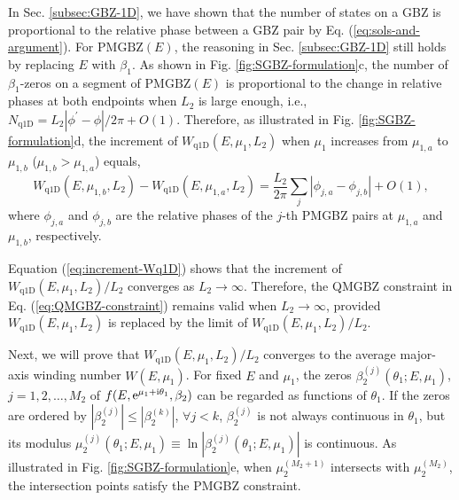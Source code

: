 In Sec. \ref{subsec:GBZ-1D}, we have shown that the number of states
on a GBZ is proportional to the relative phase between a GBZ pair
by Eq. (\ref{eq:sols-and-argument}). For $\text{PMGBZ}(E)$, the
reasoning in Sec. \ref{subsec:GBZ-1D} still holds by replacing $E$
with $\beta_{1}$. As shown in Fig. \ref{fig:SGBZ-formulation}c,
the number of $\beta_{1}$-zeros on a segment of $\text{PMGBZ}(E)$
is proportional to the change in relative phases at both endpoints
when $L_{2}$ is large enough, i.e., $N_{\text{q1D}}=L_{2}|\phi^{\prime}-\phi|/2\pi+O(1)$.
Therefore, as illustrated in Fig. \ref{fig:SGBZ-formulation}d, the
increment of $W_{\text{q1D}}(E,\mu_{1},L_{2})$ when $\mu_{1}$ increases
from $\mu_{1,a}$ to $\mu_{1,b}$ ($\mu_{1,b}>\mu_{1,a}$) equals,
\begin{equation}
W_{\text{q1D}}\left(E,\mu_{1,b},L_{2}\right)-W_{\text{q1D}}\left(E,\mu_{1,a},L_{2}\right)=\frac{L_{2}}{2\pi}\sum_{j}\left|\phi_{j,a}-\phi_{j,b}\right|+O(1),\label{eq:increment-Wq1D}
\end{equation}
where $\phi_{j,a}$ and $\phi_{j,b}$ are the relative phases of the
$j$-th PMGBZ pairs at $\mu_{1,a}$ and $\mu_{1,b}$, respectively.

Equation (\ref{eq:increment-Wq1D}) shows that the increment of $W_{\text{q1D}}(E,\mu_{1},L_{2})/L_{2}$
converges as $L_{2}\rightarrow\infty$. Therefore, the QMGBZ constraint
in Eq. (\ref{eq:QMGBZ-constraint}) remains valid when $L_{2}\rightarrow\infty$,
provided $W_{\text{q1D}}(E,\mu_{1},L_{2})$ is replaced by the limit
of $W_{\text{q1D}}(E,\mu_{1},L_{2})/L_{2}$.

Next, we will prove that $W_{\text{q1D}}(E,\mu_{1},L_{2})/L_{2}$ converges to the average major-axis winding number $W(E,\mu_1)$. 
For fixed $E$ and $\mu_{1}$, the zeros $\beta_{2}^{(j)}(\theta_{1};E,\mu_{1})$,
$j=1,2,\dots,M_{2}$ of $f(E,\mathrm{e}^{\mu_{1}+\mathrm{i}\theta_{1}},\beta_{2})$
can be regarded as functions of $\theta_{1}$. If the zeros are ordered
by $|\beta_{2}^{(j)}|\leq|\beta_{2}^{(k)}|$, $\forall j<k$, $\beta_{2}^{(j)}$
is not always continuous in $\theta_{1}$, but its modulus $\mu_{2}^{(j)}(\theta_{1};E,\mu_{1})\equiv\ln|\beta_{2}^{(j)}(\theta_{1};E,\mu_{1})|$
is continuous. As illustrated in Fig. \ref{fig:SGBZ-formulation}e,
when $\mu_{2}^{(M_{2}+1)}$ intersects with $\mu_{2}^{(M_{2})}$,
the intersection points satisfy the PMGBZ constraint.

